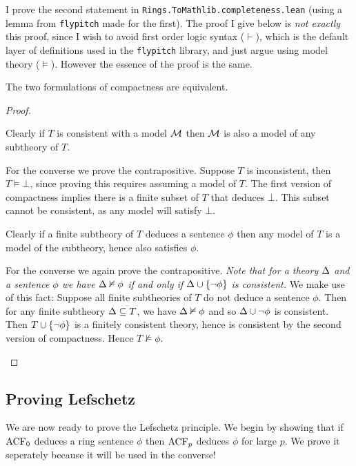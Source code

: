 I prove the second statement in
\texttt{Rings.ToMathlib.completeness.lean}
(using a lemma from \texttt{flypitch} made for the first).
The proof I give below is \textit{not exactly} this proof,
since I wish to avoid first order logic syntax ($\vdash$),
which is the default layer of
definitions used in the \texttt{flypitch} library,
and just argue using model theory ($\vDash$).
However the essence of the proof is the same.

\begin{prop}
  The two formulations of compactness are equivalent.
\end{prop}
\begin{proof}
  \begin{forward}
    Clearly if $T$ is consistent with a model $\mathcal{M}$ then $\mathcal{M}$
    is also a model of any subtheory of $T$.

    For the converse we prove the contrapositive.
    Suppose $T$ is inconsistent, then $T \vDash \bot$,
    since proving this requires assuming a model of $T$.
    The first version of compactness
    implies there is a finite subset of $T$ that deduces $\bot$.
    This subset cannot be consistent, as any model will satisfy $\bot$.
  \end{forward}

  \begin{backward}
    Clearly if a finite subtheory of $T$ deduces a sentence $\phi$ then
    any model of $T$ is a model of the subtheory, hence also satisfies $\phi$.

    For the converse we again prove the contrapositive.
    \textit{Note that for a theory $\Delta$ and a sentence $\phi$ we have
      $\Delta \nvDash \phi$ if and only if $\Delta \cup \left\{\neg \phi\right\}$ is consistent.}
    We make use of this fact:
    Suppose all finite subtheories of $T$ do not deduce a sentence $\phi$.
    Then for any finite subtheory $\Delta \subseteq T$, we have $\Delta \nvDash \phi$ and so
    $\Delta \cup {\neg \phi}$ is consistent.
    Then $T \cup \left\{\neg \phi\right\}$ is a finitely consistent theory,
    hence is consistent by the second version of compactness.
    Hence $T \nvDash \phi$.
  \end{backward}
\end{proof}

\subsection{Proving Lefschetz}

We are now ready to prove the Lefschetz principle.
We begin by showing that if $\operatorname{ACF}_{0}$ deduces a ring sentence $\phi$
then $\operatorname{ACF}_{p}$ deduces $\phi$ for large $p$.
We prove it seperately because it will be used in the converse!

